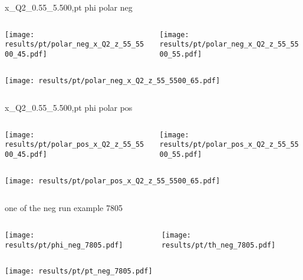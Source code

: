 \begin{frame}{x\_Q2\_0.55\_5.500,pt phi polar neg}
\begin{columns}
\begin{column}[T]{0.5\textwidth}
\texttt{[image: results/pt/polar\_neg\_x\_Q2\_z\_55\_5500\_45.pdf]}
\end{column}
\begin{column}[T]{0.5\textwidth}
\texttt{[image: results/pt/polar\_neg\_x\_Q2\_z\_55\_5500\_55.pdf]}
\end{column}
\end{columns}
\begin{columns}
\begin{column}[T]{0.5\textwidth}
\texttt{[image: results/pt/polar\_neg\_x\_Q2\_z\_55\_5500\_65.pdf]}
\end{column}
\begin{column}[T]{0.5\textwidth}
\end{column}
\end{columns}
\end{frame}
\begin{frame}{x\_Q2\_0.55\_5.500,pt phi polar pos}
\begin{columns}
\begin{column}[T]{0.5\textwidth}
\texttt{[image: results/pt/polar\_pos\_x\_Q2\_z\_55\_5500\_45.pdf]}
\end{column}
\begin{column}[T]{0.5\textwidth}
\texttt{[image: results/pt/polar\_pos\_x\_Q2\_z\_55\_5500\_55.pdf]}
\end{column}
\end{columns}
\begin{columns}
\begin{column}[T]{0.5\textwidth}
\texttt{[image: results/pt/polar\_pos\_x\_Q2\_z\_55\_5500\_65.pdf]}
\end{column}
\begin{column}[T]{0.5\textwidth}
\end{column}
\end{columns}
\end{frame}
\begin{frame}{one of the neg run example 7805}
\begin{columns}
\begin{column}[T]{0.5\textwidth}
\texttt{[image: results/pt/phi\_neg\_7805.pdf]}
\end{column}
\begin{column}[T]{0.5\textwidth}
\texttt{[image: results/pt/th\_neg\_7805.pdf]}
\end{column}
\end{columns}
\begin{columns}
\begin{column}[T]{0.5\textwidth}
\texttt{[image: results/pt/pt\_neg\_7805.pdf]}
\end{column}
\begin{column}[T]{0.5\textwidth}
\end{column}
\end{columns}
\end{frame}
